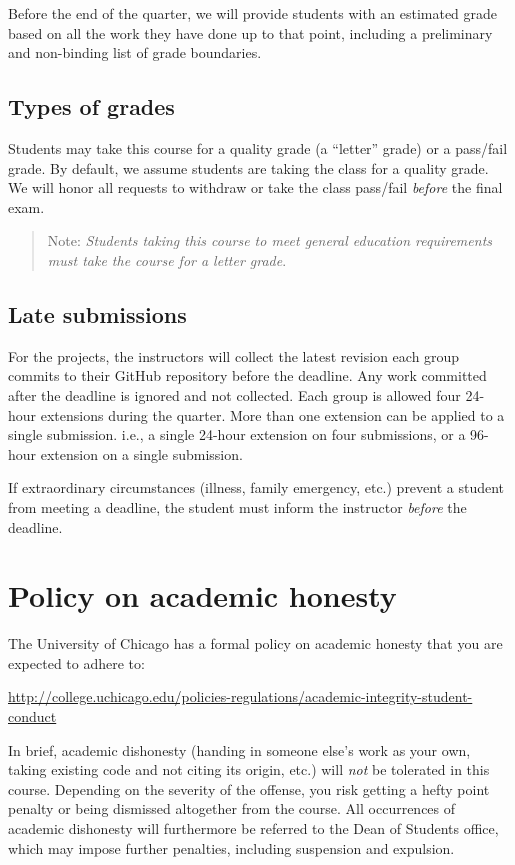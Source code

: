 \documentclass[11pt]{article}
\begin{document}
Before the end of the quarter, we will provide students with an estimated grade based on all the work they have done up to that point, including a preliminary and non-binding list of grade boundaries.

\subsection{Types of grades}

Students may take this course for a quality grade (a ``letter'' grade) or a pass/fail grade. By default, we assume students are taking the class for a quality grade. We will honor all requests to withdraw or take the class pass/fail \emph{before} the final exam.

\begin{quote}
Note: \emph{Students taking this course to meet general education requirements must take the course for a letter grade}. 
\end{quote}


\subsection{Late submissions}

For the projects, the instructors will collect the latest revision each group commits to their GitHub repository before the deadline. Any work committed after the deadline is ignored and not collected. Each group is allowed four 24-hour extensions during the quarter. More than one extension can be applied to a single submission. i.e., a single 24-hour extension on four submissions, or a 96-hour extension on a single submission.

If extraordinary circumstances (illness, family emergency, etc.) prevent a student from meeting a deadline, the student must inform the instructor \emph{before} the deadline.


\section{Policy on academic honesty}

The University of Chicago has a formal policy on academic honesty that you are expected to adhere to:

\begin{center}
\url{http://college.uchicago.edu/policies-regulations/academic-integrity-student-conduct}
\end{center}

In brief, academic dishonesty (handing in someone else's work as your own, taking existing code and not citing its origin, etc.) will \emph{not} be tolerated in this course. Depending on the severity of the offense, you risk getting a hefty point penalty or being dismissed altogether from the course. All occurrences of academic dishonesty will furthermore be referred to the Dean of Students office, which may impose further penalties, including suspension and expulsion.
\end{document}
